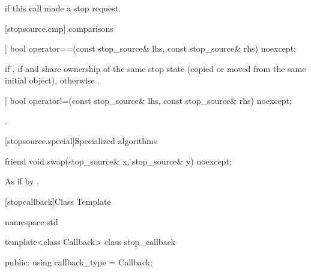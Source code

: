 {\begin{itemdescr}
  \pnum\returns {} if this call made a stop request.
\end{itemdescr}


[stopsource.cmp]{ comparisons}

%
\begin{itemdecl}
[[nodiscard]] bool operator==(const stop_source& lhs, const stop_source& rhs) noexcept;
\end{itemdecl}
\begin{itemdescr}
  \pnum\returns {} if ,
                 if  and  share ownership
                of the same stop state
                (copied or moved from the same initial  object),
                otherwise .
\end{itemdescr}

%
\begin{itemdecl}
[[nodiscard]] bool operator!=(const stop_source& lhs, const stop_source& rhs) noexcept;
\end{itemdecl}
\begin{itemdescr}
  \pnum\returns {}.
\end{itemdescr}


[stopsource.special]{Specialized algorithms}

%
\begin{itemdecl}
friend void swap(stop_source& x, stop_source& y) noexcept;
\end{itemdecl}

\begin{itemdescr}
\pnum\effects As if by .
\end{itemdescr}



%
[stopcallback]{Class Template }

\pnum
{}%

\begin{codeblock}
namespace std {
  template<class Callback>
  class stop_callback {
  public:
    using callback_type = Callback;

}}
\end{codeblock}}
